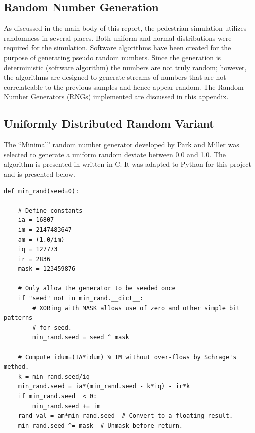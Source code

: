 \documentclass[paper=a4, fontsize=11pt]{scrartcl}
\numberwithin{equation}{section}		%
\numberwithin{figure}{section}			%
\numberwithin{table}{section}		    %
\begin{document}
\newpage
\begin{appendices}

\section{Random Number Generation}\label{sec:A:rng}
As discussed in the main body of this report, the pedestrian simulation utilizes randomness 
in several places. Both uniform and normal distributions were required for the simulation.
Software algorithms have been created for the purpose of generating pseudo random numbers. 
Since the generation is deterministic (software algorithm) the numbers are not truly 
random; however, the algorithms are designed to generate streams of numbers that are not 
correlateable to the previous samples and hence appear random. The Random Number Generators 
(RNGs) implemented are discussed in this appendix.

\subsection{Uniformly Distributed Random Variant}\label{sec:A:rng:uniformrng}
The ``Minimal'' random number generator developed by Park and Miller 
\cite{press1996numerical} was selected to generate a uniform random deviate between 0.0 and 
1.0. The algorithm is presented in \cite{press1996numerical} written in C. It was adapted 
to Python for this project and is presented below.\\

\lstset{language=Python}
\begin{lstlisting}[frame=single, label=some-code, caption=Minimal Random Number Generator]
def min_rand(seed=0):

    # Define constants
    ia = 16807
    im = 2147483647
    am = (1.0/im)
    iq = 127773
    ir = 2836
    mask = 123459876
	
    # Only allow the generator to be seeded once
    if "seed" not in min_rand.__dict__:
        # XORing with MASK allows use of zero and other simple bit patterns
        # for seed.
        min_rand.seed = seed ^ mask

    # Compute idum=(IA*idum) % IM without over-flows by Schrage's method.
    k = min_rand.seed/iq
    min_rand.seed = ia*(min_rand.seed - k*iq) - ir*k
    if min_rand.seed  < 0:
        min_rand.seed += im
    rand_val = am*min_rand.seed  # Convert to a floating result.
    min_rand.seed ^= mask  # Unmask before return.
    

\end{lstlisting}
\end{appendices}
\end{document}
